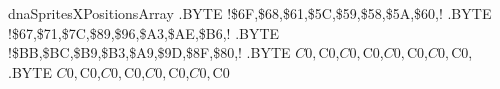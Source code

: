 dnaSpritesXPositionsArray
.BYTE !\colorbox{blue!35}{\$6F,\$68,\$61,\$5C,\$59,\$58,\$5A,\$60,}!
.BYTE !\colorbox{blue!35}{\$67,\$71,\$7C,\$89,\$96,\$A3,\$AE,\$B6,}!
.BYTE !\colorbox{blue!35}{\$BB,\$BC,\$B9,\$B3,\$A9,\$9D,\$8F,\$80,}!
.BYTE $C0,$C0,$C0,$C0,$C0,$C0,$C0,$C0,
.BYTE $C0,$C0,$C0,$C0,$C0,$C0,$C0,$C0
